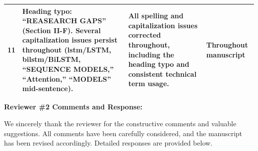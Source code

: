 \documentclass[11pt,a4paper]{article}
\begin{document}
\begin{longtable}{|p{1.5cm}|p{3.5cm}|p{6.2cm}|p{2.8cm}|}
11 & Heading typo: ``REASEARCH GAPS'' (Section II-F). Several capitalization issues persist throughout (lstm/LSTM, bilstm/BiLSTM, ``SEQUENCE MODELS,'' ``Attention,'' ``MODELS'' mid-sentence). & All spelling and capitalization issues corrected throughout, including the heading typo and consistent technical term usage. & Throughout manuscript \\
\hline

\end{longtable}

\vspace{1em}

{\large \textbf{Reviewer \#2 Comments and Response:}}

\vspace{0.5em}
We sincerely thank the reviewer for the constructive comments and valuable suggestions. All comments have been carefully considered, and the manuscript has been revised accordingly. Detailed responses are provided below.

\vspace{0.5em}
\end{document}
